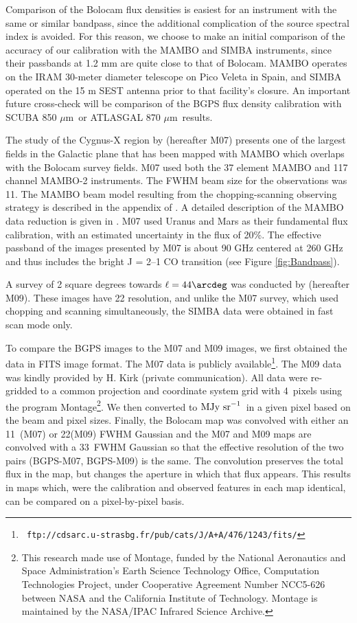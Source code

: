 \documentclass[12pt,preprint]{aastex}
\newcommand{\mum}{\ensuremath{\mu \mathrm{m}}}
\newcommand\mjysr{\ensuremath{{\rm MJy~sr}^{-1}}}
\begin{document}
Comparison of the Bolocam flux densities is easiest for an instrument
with the same or similar bandpass, since the additional complication
of the source spectral index is avoided.  For this reason, we choose
to make an initial comparison of the accuracy of our calibration with
the MAMBO and SIMBA instruments, since their passbands at 1.2 mm are
quite close to that of Bolocam.  MAMBO operates on the IRAM 30-meter
diameter telescope on Pico Veleta in Spain, and SIMBA operated on the
15 m SEST antenna prior to that facility's closure.  An important
future cross-check will be comparison of the BGPS flux density
calibration with SCUBA 850 \mum\ or ATLASGAL 870 \mum\ results.

The study of the Cygnus-X region by \citet{motte07} (hereafter M07)
presents one of the largest fields in the Galactic plane that has been
mapped with MAMBO which overlaps with the Bolocam survey fields.  M07
used both the 37 element MAMBO and 117 channel MAMBO-2
instruments. The FWHM beam size for the observations was 11\arcsec.
The MAMBO beam model resulting from the chopping-scanning observing
strategy is described in the appendix of \citet{motte01}.  A detailed
description of the MAMBO data reduction is given in
\citet{kauffmann08}.  M07 used Uranus and Mars as their fundamental
flux calibration, with an estimated uncertainty in the flux of 20\%.
The effective passband of the images presented by M07 is about 90 GHz
centered at 260 GHz and thus includes the bright J = 2--1 CO
transition (see Figure \ref{fig:Bandpass}).  

A survey of 2 square degrees towards $\ell = 44\arcdeg$ was conducted
by \citet{matthews09} (hereafter M09).  These images have 22\arcsec
resolution, and unlike the M07 survey, which used chopping and
scanning simultaneously, the SIMBA data were obtained in fast scan
mode only.

To compare the BGPS images to the M07 and M09 images, we first
obtained the data in FITS image format.  The M07 data is publicly
available\footnote{{\tt
ftp://cdsarc.u-strasbg.fr/pub/cats/J/A+A/476/1243/fits/}}.  The M09
data was kindly provided by H. Kirk (private communication).  All data
were re-gridded to a common projection and coordinate system grid with
4\arcsec\ pixels using the program Montage\footnote{This research made
use of Montage, funded by the National Aeronautics and Space
Administration's Earth Science Technology Office, Computation
Technologies Project, under Cooperative Agreement Number NCC5-626
between NASA and the California Institute of Technology. Montage is
maintained by the NASA/IPAC Infrared Science Archive.}.  We then
converted to \mjysr\ in a given pixel based on the beam and pixel
sizes.  Finally, the Bolocam map was convolved with either an
11\arcsec\ (M07) or 22\arcsec (M09) FWHM Gaussian and the M07 and M09
maps are convolved with a 33\arcsec\ FWHM Gaussian so that the
effective resolution of the two pairs (BGPS-M07, BGPS-M09) is the
same.  The convolution preserves the total flux in the map, but
changes the aperture in which that flux appears.  This results in maps
which, were the calibration and observed features in each map
identical, can be compared on a pixel-by-pixel basis.
\end{document}
